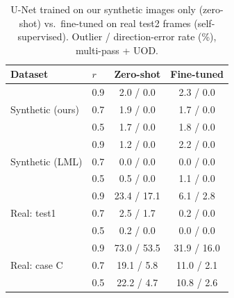 \begin{table}[t]
\centering
\caption{U-Net trained on our synthetic images only (zero-shot) vs.\ fine-tuned on real test2 frames (self-supervised). Outlier / direction-error rate (\%), multi-pass + UOD.}
\label{tab:model}
\small
\begin{tabular}{llcc}
\toprule
Dataset & $r$ & Zero-shot & Fine-tuned \\
\midrule
\multirow{3}{*}{Synthetic (ours)} & 0.9 & 2.0 / 0.0 & 2.3 / 0.0 \\
 & 0.7 & 1.9 / 0.0 & 1.7 / 0.0 \\
 & 0.5 & 1.7 / 0.0 & 1.8 / 0.0 \\
\midrule
\multirow{3}{*}{Synthetic (LML)} & 0.9 & 1.2 / 0.0 & 2.2 / 0.0 \\
 & 0.7 & 0.0 / 0.0 & 0.0 / 0.0 \\
 & 0.5 & 0.5 / 0.0 & 1.1 / 0.0 \\
\midrule
\multirow{3}{*}{Real: test1} & 0.9 & 23.4 / 17.1 & 6.1 / 2.8 \\
 & 0.7 & 2.5 / 1.7 & 0.2 / 0.0 \\
 & 0.5 & 0.2 / 0.0 & 0.0 / 0.0 \\
\midrule
\multirow{3}{*}{Real: case C} & 0.9 & 73.0 / 53.5 & 31.9 / 16.0 \\
 & 0.7 & 19.1 / 5.8 & 11.0 / 2.1 \\
 & 0.5 & 22.2 / 4.7 & 10.8 / 2.6 \\
\bottomrule
\end{tabular}
\end{table}

